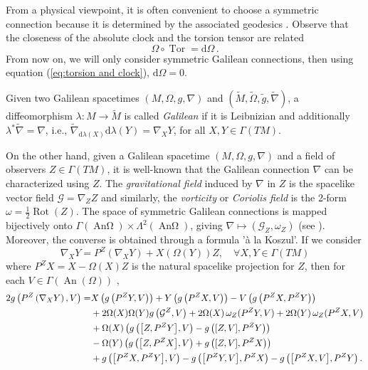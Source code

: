 \documentclass[12pt]{article}
\newcommand{\diff}{\mathrm{d}}
\newcommand{\spacetime}{(M,\Omega,g,\nabla)}
\DeclareMathOperator{\An}{\text{An}\Omega}
\DeclareMathOperator{\rot}{Rot}
\DeclareMathOperator{\tor}{Tor}
\def\G{\mathcal G}
\begin{document}
From a physical viewpoint, it is often convenient to choose a symmetric connection because it is determined by the associated geodesics \cite[Add. 1, Ch. 6]{Spivak2}. Observe that the closeness of the absolute clock and the torsion tensor are related \cite[Lemma 13]{Bernal}
\begin{equation}\label{eq:torsion and clock}
    \Omega \circ \tor = \diff \Omega\,.
\end{equation}
From now on, we will only consider symmetric Galilean connections, then using equation (\ref{eq:torsion and clock}), $\diff \Omega = 0$.

Given two Galilean spacetimes $\spacetime$ and $(\widetilde{M}, \widetilde{\Omega}, \widetilde{g}, \widetilde{\nabla})$, a diffeomorphism $\lambda\colon M \to \widetilde{M}$ is called {\it Galilean} if it is Leibnizian and additionally $\lambda^* \widetilde{\nabla} = \nabla$, i.e., $\widetilde{\nabla}_{\diff\lambda(X)} \diff \lambda(Y) = \nabla_X Y$, for all $X,Y\in \Gamma(TM)$.

On the other hand, given a Galilean spacetime $\spacetime$ and a field of observers $Z\in \Gamma(TM)$, it is well-known that the Galilean connection $\nabla$ can be characterized using $Z$. The \textit{gravitational field} induced by $\nabla$ in  $Z$ is the spacelike vector field $\G =\nabla_Z Z$ and similarly, the \textit{vorticity} or \textit{Coriolis field} is the 2-form $\omega = \tfrac12 \rot(Z)$. The space of symmetric Galilean connections is mapped bijectively onto $\Gamma(\An) \times \Lambda^2(\An)$, giving $\nabla \mapsto (\G_Z, \omega_Z)$ (see \cite[Cor. 28]{Bernal}). 
Moreover, the converse is obtained through a formula 'à la Koszul'. If we consider
$$
\nabla_X Y=P^Z\left(\nabla_X Y\right)+X(\Omega(Y)) Z, \quad \forall X, Y \in \Gamma(T M)
$$
where $P^Z X=X-\Omega(X) Z$ is the natural spacelike projection for $Z$, then for each $V \in \Gamma(\operatorname{An}(\Omega))$ \cite[eq. (13)]{Bernal},
\begin{equation}\label{eq:Koszul}
\footnotesize
\begin{aligned}
2 g\left(P^Z\left(\nabla_X Y\right), V\right)= & X\left(g\left(P^Z Y, V\right)\right)+Y\left(g\left(P^Z X, V\right)\right)-V\left(g\left(P^Z X, P^Z Y\right)\right) \\
& +2 \Omega(X) \Omega(Y) g\left(\mathcal{G}^Z, V\right) +2 \Omega(X) \,\omega_{Z}(P^Z Y, V)+2 \Omega(Y)\, \omega_{Z}(P^Z X, V) \\
& +\Omega(X)\left(g\left(\big[Z, P^Z Y\big], V\right)-g\left([Z, V], P^Z Y\right)\right) \\
& -\Omega(Y)\left(g\left(\big[Z, P^Z X\big], V\right)+g\left([Z, V], P^Z X\right)\right) \\
& +g\left(\big[P^Z X, P^Z Y\big], V\right)-g\left(\big[P^Z Y, V\big], P^Z X\right) -g\left(\big[P^Z X, V\big], P^Z Y\right) .
\end{aligned}
\end{equation}
\end{document}
